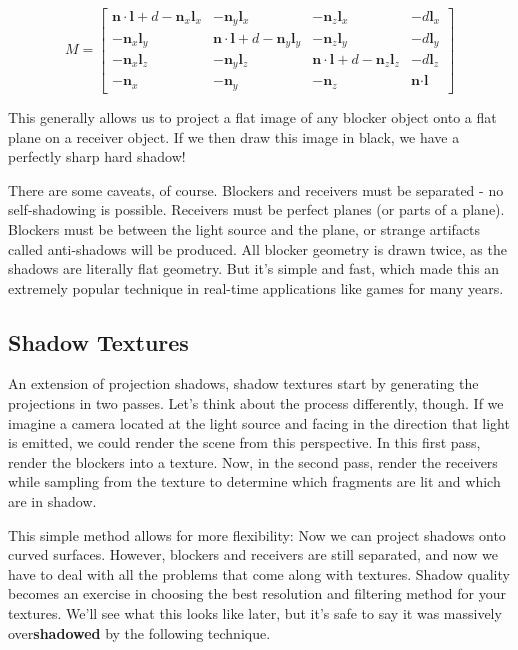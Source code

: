 \documentclass[acmsmall, screen, authorversion, nonacm]{acmart}
\begin{document}
\begin{equation}
  M = 
  \begin{bmatrix}
  \textbf{n} \cdot \textbf{l} + d - \textbf{n}_x \textbf{l}_x & -\textbf{n}_y \textbf{l}_x & -\textbf{n}_z \textbf{l}_x & -d \textbf{l}_x \\
  -\textbf{n}_x \textbf{l}_y & \textbf{n} \cdot \textbf{l} + d - \textbf{n}_y \textbf{l}_y  & -\textbf{n}_z \textbf{l}_y & -d \textbf{l}_y \\
  -\textbf{n}_x \textbf{l}_z & -\textbf{n}_y \textbf{l}_z & \textbf{n} \cdot \textbf{l} + d - \textbf{n}_z \textbf{l}_z & -d \textbf{l}_z \\
  -\textbf{n}_x & -\textbf{n}_y & -\textbf{n}_z & \textbf{n} \cdot \textbf{l}
  \end{bmatrix}
\end{equation}

This generally allows us to project a flat image of any blocker object onto a flat plane on a receiver object. If we then draw this image in black, we have a perfectly sharp hard shadow!

There are some caveats, of course. Blockers and receivers must be separated - no self-shadowing is possible. Receivers must be perfect planes (or parts of a plane). Blockers must be between the light source and the plane, or strange artifacts called anti-shadows will be produced. All blocker geometry is drawn twice, as the shadows are literally flat geometry. But it's simple and fast, which made this an extremely popular technique in real-time applications like games for many years\cite{akenine2019real}.

\subsection{Shadow Textures}

An extension of projection shadows\cite{akenine2019real}, shadow textures start by generating the projections in two passes. Let's think about the process differently, though. If we imagine a camera located at the light source and facing in the direction that light is emitted, we could render the scene from this perspective. In this first pass, render the blockers into a texture. Now, in the second pass, render the receivers while sampling from the texture to determine which fragments are lit and which are in shadow.

This simple method allows for more flexibility: Now we can project shadows onto curved surfaces. However, blockers and receivers are still separated, and now we have to deal with all the problems that come along with textures. Shadow quality becomes an exercise in choosing the best resolution and filtering method for your textures. We'll see what this looks like later, but it's safe to say it was massively over\textbf{shadowed} by the following technique.
\end{document}
